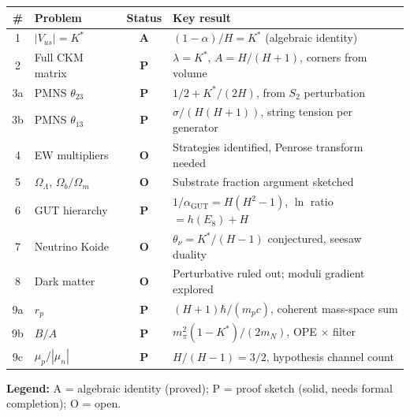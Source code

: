 \documentclass[11pt,a4paper]{article}
\theoremstyle{definition}
\theoremstyle{remark}
\begin{document}
\begin{center}
\renewcommand{\arraystretch}{1.2}
\begin{tabular}{clcl}
\toprule
\# & Problem & Status & Key result \\
\midrule
1 & $|V_{us}| = K^*$ & \textbf{A} & $(1-\alpha)/H = K^*$ (algebraic identity) \\
2 & Full CKM matrix & \textbf{P} & $\lambda = K^*$, $A = H/(H+1)$, corners from volume \\
3a & PMNS $\theta_{23}$ & \textbf{P} & $1/2 + K^*/(2H)$, from $S_2$ perturbation \\
3b & PMNS $\theta_{13}$ & \textbf{P} & $\sigma/(H(H+1))$, string tension per generator \\
4 & EW multipliers & \textbf{O} & Strategies identified, Penrose transform needed \\
5 & $\Omega_\Lambda$, $\Omega_b/\Omega_m$ & \textbf{O} & Substrate fraction argument sketched \\
6 & GUT hierarchy & \textbf{P} & $1/\alpha_{\mathrm{GUT}} = H(H^2-1)$, $\ln$ ratio $= h(E_8)+H$ \\
7 & Neutrino Koide & \textbf{O} & $\theta_\nu = K^*/(H-1)$ conjectured, seesaw duality \\
8 & Dark matter & \textbf{O} & Perturbative ruled out; moduli gradient explored \\
9a & $r_p$ & \textbf{P} & $(H+1)\hbar/(m_p c)$, coherent mass-space sum \\
9b & $B/A$ & \textbf{P} & $m_\pi^2(1-K^*)/(2m_N)$, OPE $\times$ filter \\
9c & $\mu_p/|\mu_n|$ & \textbf{P} & $H/(H-1) = 3/2$, hypothesis channel count \\
\bottomrule
\end{tabular}
\end{center}

\textbf{Legend:} A = algebraic identity (proved); P = proof sketch (solid, needs formal completion); O = open.
\end{document}
